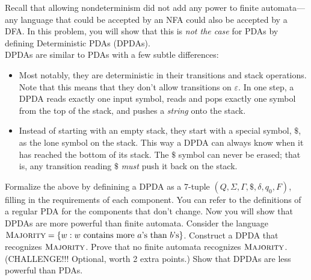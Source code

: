 \documentclass[solution, letterpaper]{cs121}
\begin{document}


Recall that allowing nondeterminism did not add any power to finite 
automata---any language that could be accepted by an NFA could also be 
accepted by a DFA. In this problem, you will show that this is \emph{not 
the case} for PDAs by defining Deterministic PDAs (DPDAs). \\ 

DPDAs are similar to PDAs with a few subtle differences: 
\begin{itemize}
\item Most notably, they are deterministic in their transitions and
  stack operations.  Note that this means that they don't allow
  transitions on $\varepsilon$.  In one step, a DPDA reads exactly one
  input symbol, reads and pops exactly one symbol from the top of the
  stack, and pushes a {\em string} onto the stack.
\item Instead of starting with an empty stack, they start with a
  special symbol, $\$$, as the lone symbol on the stack. This way a
  DPDA can always know when it has reached the bottom of its
  stack. The $\$$ symbol can never be erased; that is, any transition
  reading $\$$ \emph{must} push it back on the stack.
\end{itemize}

\subproblem  Formalize the above by definining a DPDA as a 7-tuple $(Q,
\Sigma, \Gamma, \$, \delta, q_0, F)$, filling in the requirements of
each component.  You can refer to the definitions of a regular PDA for
the components that don't change.
\subproblem Now you will show that DPDAs are more powerful than finite automata. Consider the language $\textsc{Majority} =\{w: w \text{ contains more
$a$'s than  $b$'s}\}$. Construct a DPDA that recognizes $\textsc{Majority}$. Prove that no finite automata recognizes $\textsc{Majority}$.
\subproblem (CHALLENGE!!! Optional, worth 2 extra points.) Show that DPDAs are less powerful than PDAs.
\end{document}
